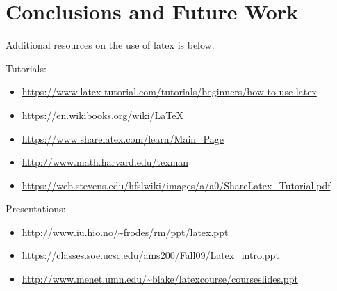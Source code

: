 \chapter{Conclusions and Future Work}


Additional resources on the use of latex is below.

Tutorials:
\begin{itemize}
    \item \url{https://www.latex-tutorial.com/tutorials/beginners/how-to-use-latex}
    \item \url{https://en.wikibooks.org/wiki/LaTeX}
    \item \url{https://www.sharelatex.com/learn/Main_Page}
    \item \url{http://www.math.harvard.edu/texman}
    \item \url{https://web.stevens.edu/hfslwiki/images/a/a0/ShareLatex_Tutorial.pdf}
\end{itemize}

Presentations:
\begin{itemize}
    \item \url{http://www.iu.hio.no/~frodes/rm/ppt/latex.ppt}
    \item \url{https://classes.soe.ucsc.edu/ams200/Fall09/Latex_intro.ppt}
    \item \url{http://www.menet.umn.edu/~blake/latexcourse/courseslides.ppt}
\end{itemize}
